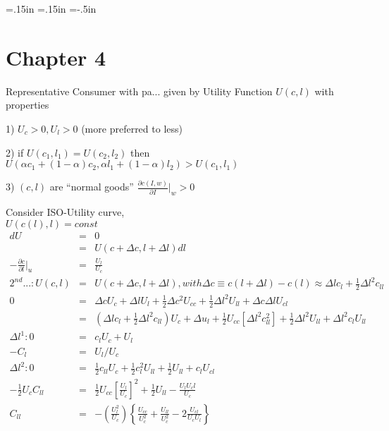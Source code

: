 \oddsidemargin=.15in
\evensidemargin=.15in
\textwidth=6in
\topmargin=-.5in
\textheight=9in
\parindent=0in
\pagestyle{empty}


\section*{Chapter 4}
Representative Consumer with pa... given by Utility Function $U(c, l)$ with properties
\begin{list}{ }
 \item 1) $U_c > 0, U_l > 0$ (more preferred to less)
 \item 2) if $U(c_1, l_1) = U(c_2, l_2)$ then $U(\alpha c_1 + (1-\alpha) c_2, \alpha l_1 + (1-\alpha) l_2) > U(c_1, l_1)$
 \item 3) $(c, l)$ are ``normal goods'' $\frac{\partial c(I, w)}{\partial I} \vert_w > 0$ \\
 \end{list} 
Consider ISO-Utility curve, \\ $U(c(l), l) = const$ 
\begin{eqnarray}
 dU &=& 0 \nonumber \\
 &=& U(c + \Delta c, l + \Delta l) dl\nonumber\\
 -\frac{\partial c}{\partial l} \vert_u &=& \frac{U_l}{U_c}\\
 2^{nd} ...: U(c, l) &=& U(c + \Delta c, l + \Delta l), with \Delta c \equiv c(l+\Delta l) - c(l) \approx \Delta l c_l + \frac{1}{2} \Delta l^2 c_{ll}\nonumber\\
 0 &=& \Delta c U_c + \Delta l U_l + \frac{1}{2} \Delta c^2 U_{cc} + \frac{1}{2} \Delta l^2 U_{ll} + \Delta c \Delta l U_{cl}\nonumber\\
 &=& (\Delta l c_l + \frac{1}{2} \Delta l^2 c_{ll})U_c + \Delta u_l + \frac{1}{2} U_{cc} \left[\Delta l^2 c^2_{ll}\right] + \frac{1}{2} \Delta l^2 U_{ll} + \Delta l^2 c_l U_{ll}\nonumber\\
 \Delta l^1 : 0 &=& c_l U_c + U_l\nonumber\\
 -C_l &=& U_l/U_c\\
 \Delta l^2 : 0 &=& \frac{1}{2}c_{ll} U_c + \frac{1}{2} c^2_l U_{ll} + \frac{1}{2} U_{ll}+ c_l U_{cl}\nonumber\\
 -\frac{1}{2}U_c C_{ll} &=& \frac{1}{2} U_{cc} [\frac{U_l}{U_c}]^2 + \frac{1}{2} U_{ll} - \frac{U_l U_cl}{U_c}\nonumber\\ 
 C_{ll} &=& - \left( \frac{U_l^2}{U_c} \right) \left\{\frac{U_{cc}}{U_c^2} + \frac{U_{ll}}{U_c^2} - 2 \frac{U_{cl}}{U_c U_l}\right\} \nonumber
\end{eqnarray}

